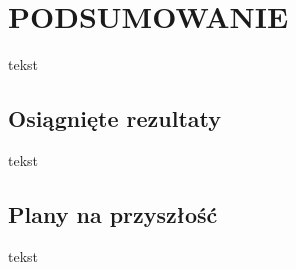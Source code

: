 \chapter{PODSUMOWANIE}
\label{chap:podsumowanie}

tekst

\section{Osiągnięte rezultaty}

tekst

\section{Plany na przyszłość}

tekst
